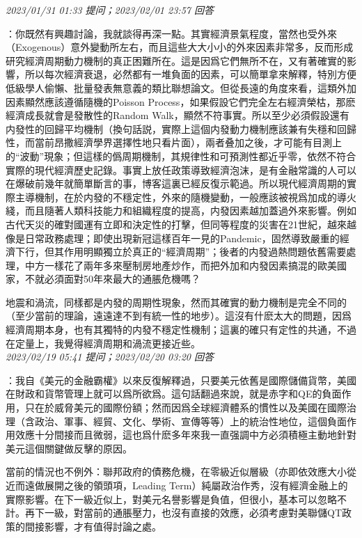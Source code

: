 \documentclass[twocolumn]{ctexart}
\begin{document}
\textit{\hfill\noindent\small 2023/01/31 01:33 提问；2023/02/01 23:57 回答}

：你既然有興趣討論，我就談得再深一點。其實經濟景氣程度，當然也受外來（Exogenous）意外變動所左右，而且這些大大小小的外來因素非常多，反而形成研究經濟周期動力機制的真正困難所在。這是因爲它們無所不在，又有著確實的影響，所以每次經濟衰退，必然都有一堆負面的因素，可以簡單拿來解釋，特別方便低級學人偷懶、批量發表無意義的類比聯想論文。但從長遠的角度來看，這類外加因素顯然應該遵循隨機的Poisson Process，如果假設它們完全左右經濟榮枯，那麽經濟成長就會是發散性的Random Walk，顯然不符事實。所以至少必須假設還有内發性的回歸平均機制（換句話説，實際上這個内發動力機制應該兼有失穩和回歸性，而當前昂撒經濟學界選擇性地只看片面），兩者叠加之後，才可能有目測上的“波動”現象；但這樣的僞周期機制，其規律性和可預測性都近乎零，依然不符合實際的現代經濟歷史記錄。事實上放任政策導致經濟泡沫，是有金融常識的人可以在爆破前幾年就簡單斷言的事，博客這裏已經反復示範過。所以現代經濟周期的實際主導機制，在於内發的不穩定性，外來的隨機變動，一般應該被視爲加成的導火綫，而且隨著人類科技能力和組織程度的提高，内發因素越加蓋過外來影響。例如古代天災的確對國運有立即和決定性的打擊，但同等程度的災害在21世紀，越來越像是日常政務處理；即使出現新冠這樣百年一見的Pandemic，固然導致嚴重的經濟下行，但其作用明顯獨立於真正的“經濟周期”；後者的内發過熱問題依舊需要處理，中方一樣花了兩年多來壓制房地產炒作，而把外加和内發因素搞混的歐美國家，不就必須面對50年來最大的通脹危機嗎？

地震和渦流，同樣都是内發的周期性現象，然而其確實的動力機制是完全不同的（至少當前的理論，遠遠達不到有統一性的地步）。這沒有什麽太大的問題，因爲經濟周期本身，也有其獨特的内發不穩定性機制；這裏的確只有定性的共通，不過在定量上，我覺得經濟周期和渦流更接近些。
\\

\textit{\hfill\noindent\small 2023/02/19 05:41 提问；2023/02/20 03:20 回答}

：我自《美元的金融霸權》以來反復解釋過，只要美元依舊是國際儲備貨幣，美國在財政和貨幣管理上就可以爲所欲爲。這句話翻過來說，就是赤字和QE的負面作用，只在於威脅美元的國際份額；然而因爲全球經濟體系的慣性以及美國在國際治理（含政治、軍事、經貿、文化、學術、宣傳等等）上的統治性地位，這個負面作用效應十分間接而且微弱，這也爲什麽多年來我一直强調中方必須積極主動地針對美元這個關鍵做反擊的原因。

當前的情況也不例外：聯邦政府的債務危機，在零級近似層級（亦即依效應大小從近而遠做展開之後的領頭項，Leading Term）純屬政治作秀，沒有經濟金融上的實際影響。在下一級近似上，對美元名譽影響是負值，但很小，基本可以忽略不計。再下一級，對當前的通脹壓力，也沒有直接的效應，必須考慮對美聯儲QT政策的間接影響，才有值得討論之處。
\end{document}
